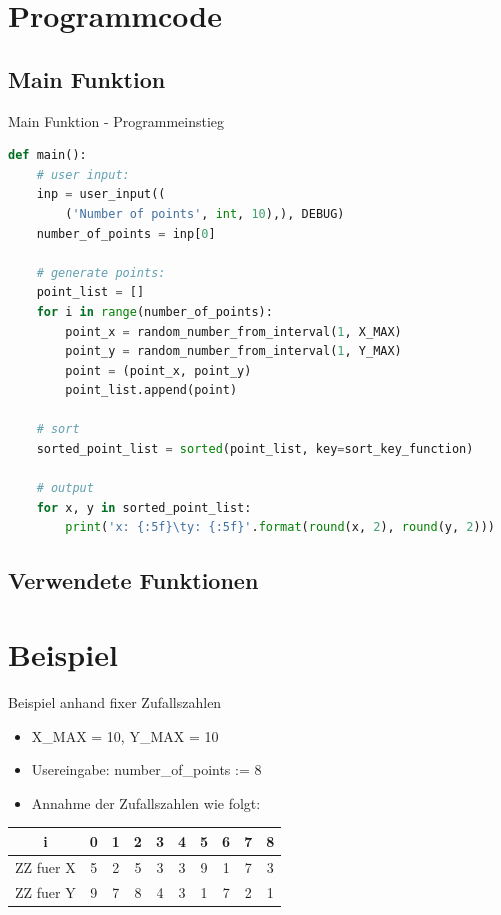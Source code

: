 \section{Programmcode}
\subsection{Main Funktion}
\begin{frame}[fragile]{Main Funktion - Programmeinstieg}
  \begin{lstlisting}[language=python]
def main():
    # user input:
    inp = user_input((
        ('Number of points', int, 10),), DEBUG)
    number_of_points = inp[0]
    
    # generate points:
    point_list = []
    for i in range(number_of_points):
        point_x = random_number_from_interval(1, X_MAX)
        point_y = random_number_from_interval(1, Y_MAX)
        point = (point_x, point_y)
        point_list.append(point)
        
    # sort
    sorted_point_list = sorted(point_list, key=sort_key_function)
    
    # output
    for x, y in sorted_point_list:
        print('x: {:5f}\ty: {:5f}'.format(round(x, 2), round(y, 2)))
\end{lstlisting}
\logopythonbottom
\end{frame}

\subsection{Verwendete Funktionen}



\section{Beispiel}
\begin{frame}{Beispiel anhand fixer Zufallszahlen}
\begin{itemize}
\item X\_MAX = 10, Y\_MAX = 10
\item Usereingabe: number\_of\_points := 8
\item Annahme der Zufallszahlen wie folgt:
\end{itemize}
\begin{center}
  \begin{tabular}{c|c|c|c|c|c|c|c|c|c}
  \hline 
  i & 0 & 1 & 2 & 3 & 4 & 5 & 6 & 7 & 8 \\ 
  \hline 
  ZZ fuer X & 5 & 2 & 5 & 3 & 3 & 9 & 1 & 7 & 3\\ 
  ZZ fuer Y & 9 & 7 & 8 & 4 & 3 & 1 & 7 & 2 & 1\\
  \hline 
  \end{tabular} 
\end{center}
\end{frame}

